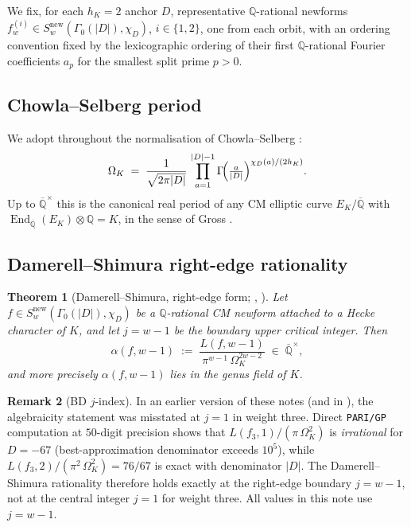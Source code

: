 \documentclass[11pt,a4paper]{amsart}
\theoremstyle{plain}
\newtheorem{theorem}{Theorem}[section]
\theoremstyle{definition}
\newtheorem{remark}[theorem]{Remark}
\DeclareMathOperator{\End}{End}
\newcommand{\Q}{\mathbb{Q}}
\newcommand{\eqdef}{:=}
\newcommand{\fl}[2]{f_{#1}^{(#2)}}
\newcommand{\absD}{\lvert D\rvert}
\begin{document}
We fix, for each $h_K=2$ anchor $D$, representative $\Q$-rational newforms
$\fl{w}{i}\in S_w^{\mathrm{new}}(\Gamma_0(\absD), \chi_D)$, $i\in\{1, 2\}$,
one from each orbit, with an ordering convention fixed by the lexicographic
ordering of their first $\Q$-rational Fourier coefficients $a_p$ for the
smallest split prime $p > 0$.

\subsection{Chowla--Selberg period}\label{ss:setup-CS}

We adopt throughout the normalisation of Chowla--Selberg
\cite{ChowlaSelberg1949}:
\begin{equation}\label{eq:CS-period}
   \Omega_K \;=\; \frac{1}{\sqrt{2\pi\absD}}\,
     \prod_{a=1}^{\absD - 1}\Gamma\!\Bigl(\tfrac{a}{\absD}\Bigr)^{\chi_D(a)/(2 h_K)}.
\end{equation}
Up to $\overline{\Q}^{\times}$ this is the canonical real period of any CM
elliptic curve $E_K/\overline{\Q}$ with
$\End_{\overline{\Q}}(E_K)\otimes\Q = K$, in the sense of
Gross \cite[Chap.~II]{Gross1980}.

\subsection{Damerell--Shimura right-edge rationality}\label{ss:setup-DS}

\begin{theorem}[Damerell--Shimura, right-edge form;
{\cite[Thm.~1]{Damerell1971a}, \cite[Thm.~1, Thm.~4]{Shimura1976}}]
\label{thm:DS}
Let $f \in S_w^{\mathrm{new}}(\Gamma_0(\absD), \chi_D)$ be a $\Q$-rational
CM newform attached to a Hecke character of $K$, and let
$j = w-1$ be the boundary upper critical integer. Then
\begin{equation}\label{eq:DS-edge}
   \alpha(f, w-1) \;\eqdef\; \frac{L(f, w-1)}{\pi^{w-1}\,\Omega_K^{2w-2}}
    \;\in\; \overline{\Q}^{\times},
\end{equation}
and more precisely $\alpha(f, w-1)$ lies in the genus field of $K$.
\end{theorem}

\begin{remark}[BD $j$-index]\label{rk:j-index}
In an earlier version of these notes (and in
\cite[OP-BEILINSON-Q-D \S4]{Remondiere2026qD}), the algebraicity statement
was misstated at $j = 1$ in weight three. Direct \texttt{PARI/GP} computation
at $50$-digit precision shows that $L(f_3, 1)/(\pi\,\Omega_K^2)$ is
\emph{irrational} for $D = -67$ (best-approximation denominator exceeds
$10^5$), while $L(f_3, 2)/(\pi^2\,\Omega_K^2) = 76/67$ is exact with
denominator $\absD$. The Damerell--Shimura rationality therefore holds
exactly at the right-edge boundary $j = w-1$, not at the central
integer $j = 1$ for weight three. All values in this note use $j = w-1$.
\end{remark}
\end{document}
